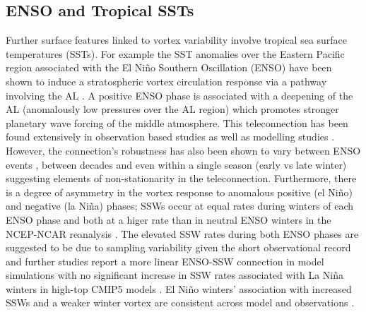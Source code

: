 \subsection{ENSO and Tropical SSTs}
\label{sec:external_influence_SSTs}
Further surface features linked to vortex variability involve tropical sea surface temperatures (SSTs). For example the SST anomalies over the Eastern Pacific region associated with the El Ni\~{n}o Southern Oscillation (ENSO) have been shown to induce a stratospheric vortex circulation response via a pathway involving the AL \citep{domeisenTeleconnection2019d}. A positive ENSO phase is associated with a deepening of the AL (anomalously low pressures over the AL region) which promotes stronger planetary wave forcing of the middle atmosphere. This teleconnection has been found extensively in observation based studies \citep{garfinkelDifferent2008b, inesonRole2009b, smithLinear2012b} as well as modelling studies \citep{bellStratospheric2009a, domeisenSeasonal2015b, manziniInfluence2006b, richterEffects2015b}. However, the connection's robustness has also been shown to vary between ENSO events \citep{deserNorthern2017b, izaStratospheric2016b}, between decades \citep{ayarzaguena2018} and even within a single season (early vs late winter) \citep{ayarzaguenaIntraseasonal2018d} suggesting elements of non-stationarity in the teleconnection. Furthermore, there is a degree of asymmetry in the vortex response to anomalous positive (el Ni\~{n}o) and negative (la Ni\~{n}a) phases; SSWs occur at equal rates during winters of each ENSO phase and both at a higer rate than in neutral ENSO winters in the NCEP-NCAR reanalysis \citep{butlerNino2011b, garfinkelWhy2012b}. The elevated SSW rates during both ENSO phases are suggested to be due to sampling variability given the short observational record and further studies report a more linear ENSO-SSW connection in model simulations \citep{polvaniDistinguishing2017b} with no significant increase in SSW rates associated with La Ni\~{n}a winters in high-top CMIP5 models \citep{songRevisiting2018b}. El Ni\~{n}o winters' association with increased SSWs and a weaker winter vortex are consistent across model and observations \citep{manziniInfluence2006b, richterEffects2015b}. 

